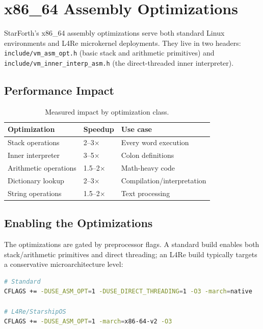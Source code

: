 
\section{x86\_64 Assembly Optimizations}

StarForth's x86\_64 assembly optimizations serve both standard Linux
environments and L4Re microkernel deployments. They live in two headers:
\texttt{include/vm\_asm\_opt.h} (basic stack and arithmetic primitives) and
\texttt{include/vm\_inner\_interp\_asm.h} (the direct-threaded inner
interpreter).

\subsection{Performance Impact}

\begin{table}[h]
\centering
\begin{tabular}{lll}
\toprule
Optimization & Speedup & Use case \\
\midrule
Stack operations & 2--3$\times$ & Every word execution \\
Inner interpreter & 3--5$\times$ & Colon definitions \\
Arithmetic operations & 1.5--2$\times$ & Math-heavy code \\
Dictionary lookup & 2--3$\times$ & Compilation/interpretation \\
String operations & 1.5--2$\times$ & Text processing \\
\bottomrule
\end{tabular}
\caption{Measured impact by optimization class.}
\end{table}

\subsection{Enabling the Optimizations}

The optimizations are gated by preprocessor flags. A standard build enables
both stack/arithmetic primitives and direct threading; an L4Re build typically
targets a conservative microarchitecture level:

\begin{lstlisting}[language=bash]
# Standard
CFLAGS += -DUSE_ASM_OPT=1 -DUSE_DIRECT_THREADING=1 -O3 -march=native

# L4Re/StarshipOS
CFLAGS += -DUSE_ASM_OPT=1 -march=x86-64-v2 -O3
\end{lstlisting}


